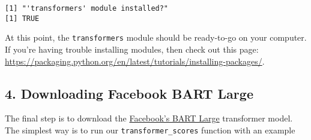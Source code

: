 \documentclass[
]{article}
\newenvironment{Shaded}{\begin{snugshade}}{\end{snugshade}}
\newcommand{\AttributeTok}[1]{\textcolor[rgb]{0.77,0.63,0.00}{#1}}
\newcommand{\CommentTok}[1]{\textcolor[rgb]{0.56,0.35,0.01}{\textit{#1}}}
\newcommand{\ConstantTok}[1]{\textcolor[rgb]{0.00,0.00,0.00}{#1}}
\newcommand{\DecValTok}[1]{\textcolor[rgb]{0.00,0.00,0.81}{#1}}
\newcommand{\FunctionTok}[1]{\textcolor[rgb]{0.00,0.00,0.00}{#1}}
\newcommand{\NormalTok}[1]{#1}
\newcommand{\SpecialCharTok}[1]{\textcolor[rgb]{0.00,0.00,0.00}{#1}}
\newcommand{\StringTok}[1]{\textcolor[rgb]{0.31,0.60,0.02}{#1}}
\begin{document}
\begin{verbatim}
[1] "'transformers' module installed?"
[1] TRUE
\end{verbatim}

At this point, the \texttt{transformers} module should be ready-to-go on
your computer. If you're having trouble installing modules, then check
out this page:
\url{https://packaging.python.org/en/latest/tutorials/installing-packages/}.

\hypertarget{downloading-facebook-bart-large}{%
\subsection{4. Downloading Facebook BART
Large}\label{downloading-facebook-bart-large}}

The final step is to download the
\href{https://huggingface.co/facebook/bart-large-mnli}{Facebook's BART Large}
transformer model. The simplest way is to run our
\texttt{transformer\_scores} function with an example

\begin{Shaded}
\end{Shaded}
\end{document}
